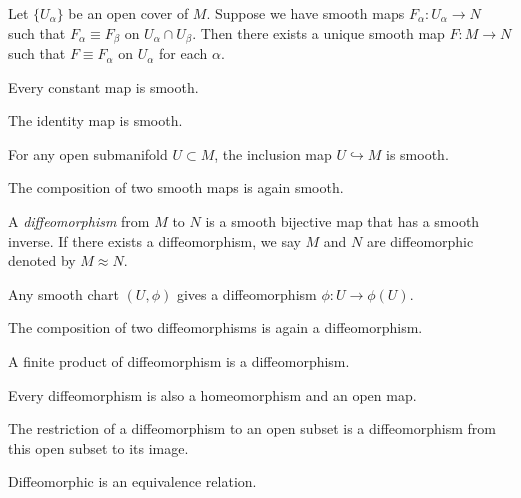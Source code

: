 \documentclass{skript}
\begin{document}
\begin{cor}
    Let $\{U_\alpha\}$ be an open cover of $M$.
    Suppose we have smooth maps $F_\alpha\colon U_\alpha \to N$ such that $F_\alpha \equiv F_\beta$ on $U_\alpha\cap U_\beta$.
    Then there exists a unique smooth map $F\colon M\to N$ such that $F\equiv F_\alpha$ on $U_\alpha$ for each $\alpha$.
\end{cor}

\begin{prop}
    \begin{alphanumerate}
    \item 
        Every constant map is smooth.
    \item
        The identity map is smooth.
    \item
        For any open submanifold $U\subset M$, the inclusion map $U\hookrightarrow M$ is smooth.
    \item
        The composition of two smooth maps is again smooth.
    \end{alphanumerate}
\end{prop}

\begin{definition}[Diffeomorphism]\label{def:diffeo}
    A \emph{diffeomorphism} from $M$ to $N$ is a smooth bijective map that has a smooth inverse.
    If there exists a diffeomorphism, we say $M$ and $N$ are diffeomorphic denoted by $M \approx N$.
\end{definition}

\begin{bsp}
    Any smooth chart $(U,\phi)$ gives a diffeomorphism $\phi\colon U \to \phi(U)$.
\end{bsp}

\begin{prop}
    \begin{alphanumerate}
    \item
        The composition of two diffeomorphisms is again a diffeomorphism.
    \item
        A finite product of diffeomorphism is a diffeomorphism.
    \item
        Every diffeomorphism is also a homeomorphism and an open map.
    \item
        The restriction of a diffeomorphism to an open subset is a diffeomorphism from this open subset to its image.
    \item
        Diffeomorphic is an equivalence relation.
    \end{alphanumerate}
\end{prop}
\end{document}
